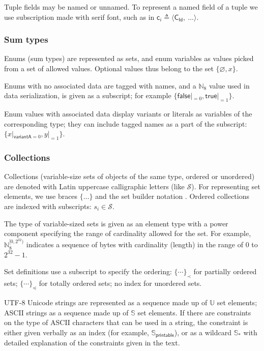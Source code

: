 \documentclass[9pt,oneside]{amsart}
\begin{document}
\begin{multicols}{2}
Tuple fields may be named or unnamed.
To represent a named field of a tuple we use subscription made with serif font,
such as in $\mathsf{c}_i \triangleq \langle \mathsf{C_{Id}}, \ \ldots \rangle$.

\subsubsection{Sum types}

Enums (sum types) are represented as sets, and enum variables as values
picked from a set of allowed values.
Optional values thus belong to the set $\{ \varnothing, x \}$.

Enums with no associated data are tagged with names,
and a $\mathbb{N}_8$ value used in data serialization, is given as a subscript;
for example $\{ \mathsf{false}|_{=0}, \mathsf{true}|_{=1} \}$.

Enum values with associated data display variants or literals as variables of the corresponding type;
they can include tagged names as a part of the subscript: $\{ x|_{\mathsf{variantA}=0}, y|_{=1} \}$.

\subsubsection{Collections}

Collections (variable-size sets of objects of the same type, ordered or unordered)
are denoted with Latin uppercase calligraphic letters (like $\mathcal{S}$).
For representing set elements, we use braces $\{\ldots\}$ and the set builder notation \cite{setbuilder}.
Ordered collections are indexed with subscripts: $s_i \in \mathcal{S}$.

The type of variable-sized sets is given as an element type with a power component
specifying the range of cardinality allowed for the set.
For example, $\mathbb{N}_8^{[0, 2^{32})}$ indicates a sequence of bytes with cardinality (length)
in the range of $0$ to $2^{32} - 1$.

Set definitions use a subscript to specify the ordering:
$\{ \cdots \}_\prec$ for partially ordered sets;
$\{ \cdots \}_\preceq$ for totally ordered sets;
no index for unordered sets.

UTF-8 Unicode strings are represented as a sequence made up of $\mathbb{U}$ set elements;
ASCII strings as a sequence made up of $\mathbb{S}$ set elements.
If there are constraints on the type of ASCII characters that can be used in a string,
the constraint is either given verbally as an index (for example, $\mathbb{S}_\mathsf{printable}$),
or as a wildcard $\mathbb{S}_*$ with detailed explanation of the constraints given in the text.


\end{multicols}
\end{document}
